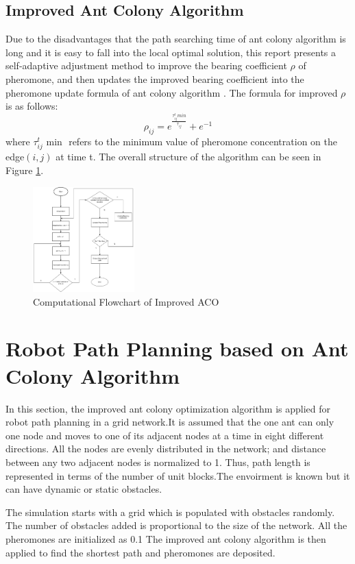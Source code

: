 \documentclass[conference]{IEEEtran}
\begin{document}
\subsection{Improved Ant Colony Algorithm}
Due to the disadvantages that the path searching time of ant colony algorithm is long and it is easy to fall into the local optimal solution, this report presents a self-adaptive adjustment method to improve the bearing coefficient $\rho$ of pheromone, and then updates the improved bearing coefficient into the pheromone update formula of ant colony algorithm \cite{9148277}. 
The formula for improved $\rho$ is as follows: 
\begin{equation}
    \rho_{ij} = e^\frac{\tau_{ij}^{t} min}{\tau_{ij}} + e^{-1}
\end{equation}
where $\tau_{ij}^{t} \mbox{ min }$ refers to the minimum value of pheromone concentration on the edge$(i,j)$ at time t. The overall structure of the algorithm can be seen in Figure \ref{fig4}.
\begin{figure}[H]
    \centering
    \includegraphics[width=0.35\textwidth]{ImprovedACO.png}
    \caption{Computational Flowchart of Improved ACO}
    \label{fig4}
\end{figure}
\section{Robot Path Planning based on Ant Colony Algorithm}
In this section, the improved ant colony optimization algorithm is applied for robot path planning in a grid network.It is assumed that the one ant can only one node and moves to one of its adjacent nodes at a time in eight different directions. All the nodes are evenly distributed in the network; and distance between any two adjacent nodes is normalized to 1. Thus, path length is represented in terms of the number of unit blocks.The envoirment is known but it can have dynamic or static obstacles. 

The simulation starts with a grid which is populated with obstacles randomly. The number of obstacles added is proportional to the size of the network. All the pheromones are initialized as 0.1 The improved ant colony algorithm is then applied to find the shortest path and pheromones are deposited. 
\end{document}
